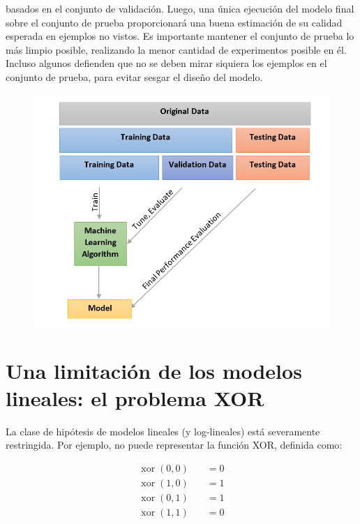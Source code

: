 basados en el conjunto de validación. Luego, una única ejecución del modelo final sobre el conjunto de prueba proporcionará una buena estimación de su calidad esperada en ejemplos no vistos. Es importante mantener el conjunto de prueba lo más limpio posible, realizando la menor cantidad de experimentos posible en él. Incluso algunos defienden que no se deben mirar siquiera los ejemplos en el conjunto de prueba, para evitar sesgar el diseño del modelo.

\begin{figure}[htb]
	\centering
	 \includegraphics[scale=0.55]{pics/validation.png}
\end{figure}



\section{Una limitación de los modelos lineales: el problema XOR}
La clase de hipótesis de modelos lineales (y log-lineales) está severamente restringida. Por ejemplo, no puede representar la función XOR, definida como:

\begin{equation}
\begin{split}
\operatorname{xor}(0,0) \quad & = 0 \\
\operatorname{xor}(1,0) \quad & = 1 \\
\operatorname{xor}(0,1) \quad & = 1 \\
\operatorname{xor}(1,1) \quad & = 0 \\
\end{split}
\end{equation}

